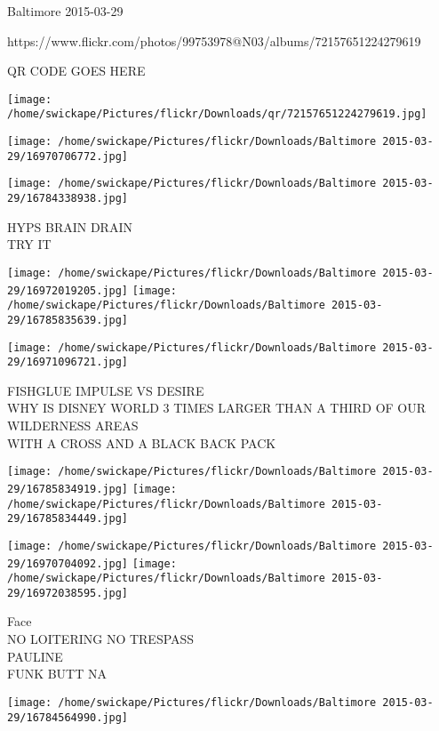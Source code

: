 \documentclass[10pt,letterpaper]{article}
\begin{document}
Baltimore 2015-03-29

https://www.flickr.com/photos/99753978@N03/albums/72157651224279619

QR CODE GOES HERE

\texttt{[image: /home/swickape/Pictures/flickr/Downloads/qr/72157651224279619.jpg]}
\pagebreak

\texttt{[image: /home/swickape/Pictures/flickr/Downloads/Baltimore 2015-03-29/16970706772.jpg]}

\vspace{0.25in}
\texttt{[image: /home/swickape/Pictures/flickr/Downloads/Baltimore 2015-03-29/16784338938.jpg]}

HYPS BRAIN DRAIN\\
TRY IT\\
\pagebreak

\texttt{[image: /home/swickape/Pictures/flickr/Downloads/Baltimore 2015-03-29/16972019205.jpg]}
\texttt{[image: /home/swickape/Pictures/flickr/Downloads/Baltimore 2015-03-29/16785835639.jpg]}

\vspace{0.25in}
\texttt{[image: /home/swickape/Pictures/flickr/Downloads/Baltimore 2015-03-29/16971096721.jpg]}

FISHGLUE IMPULSE VS DESIRE\\
WHY IS DISNEY WORLD 3 TIMES LARGER THAN A THIRD OF OUR WILDERNESS AREAS\\
WITH A CROSS AND A BLACK BACK PACK\\
\pagebreak

\texttt{[image: /home/swickape/Pictures/flickr/Downloads/Baltimore 2015-03-29/16785834919.jpg]}
\texttt{[image: /home/swickape/Pictures/flickr/Downloads/Baltimore 2015-03-29/16785834449.jpg]}

\texttt{[image: /home/swickape/Pictures/flickr/Downloads/Baltimore 2015-03-29/16970704092.jpg]}
\texttt{[image: /home/swickape/Pictures/flickr/Downloads/Baltimore 2015-03-29/16972038595.jpg]}

Face\\
NO LOITERING NO TRESPASS\\
PAULINE\\
FUNK BUTT NA\\
\pagebreak

\texttt{[image: /home/swickape/Pictures/flickr/Downloads/Baltimore 2015-03-29/16784564990.jpg]}
\end{document}
